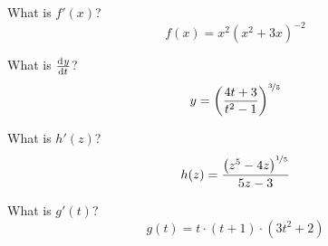 
\begin{ProblemSet}[pencil space=3in]

 \begin{Problem}
  What is $f'(x)$?
  \begin{equation*}
   f(x) = x^2 \left(x^2 + 3x\right)^{-2}
  \end{equation*}
 \end{Problem}

 \begin{Problem}
  What is $\frac{\mathrm{d}^{{}}y}{\mathrm{d} t^{{}}}$?
  \begin{equation*}
   y = \left(\frac{4t + 3}{t^2 - 1}\right)^{\nicefrac{3}{5}}
  \end{equation*}
 \end{Problem}

 \begin{Problem}
  What is $h'(z)$?
  \begin{equation*}
   h(z) = \frac{\left(z^5 - 4z\right)^{\nicefrac{1}{5}}}{5z - 3}
  \end{equation*}
 \end{Problem}

 \begin{Problem}
  What is $g'(t)$?
  \begin{equation*}
   g(t) = t\cdot(t+1)\cdot\left(3t^2 + 2\right)
  \end{equation*}
 \end{Problem}

\end{ProblemSet}

